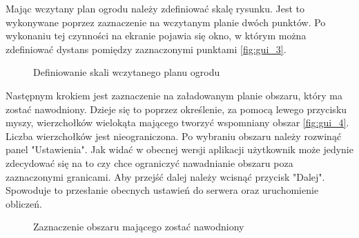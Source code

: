 \documentclass[twoside]{iisthesis}
\begin{document}
Mając wczytany plan ogrodu należy zdefiniować skalę rysunku. Jest to wykonywane poprzez zaznaczenie na wczytanym planie dwóch punktów. Po wykonaniu tej czynności na ekranie pojawia się okno, w którym można zdefiniować dystans pomiędzy zaznaczonymi punktami \eqref{fig:gui_3}.
\begin{figure}[!htb]
	\centering
	\caption{Definiowanie skali wczytanego planu ogrodu}
	\label{fig:gui_3}
\end{figure}

Następnym krokiem jest zaznaczenie na załadowanym planie obszaru, który ma zostać nawodniony. Dzieje się to poprzez określenie, za pomocą lewego przycisku myszy, wierzchołków wielokąta mającego tworzyć wspomniany obszar \eqref{fig:gui_4}. Liczba wierzchołków jest nieograniczona. Po wybraniu obszaru należy rozwinąć panel "Ustawienia". Jak widać w obecnej wersji aplikacji użytkownik może jedynie zdecydować się na to czy chce ograniczyć nawadnianie obszaru poza zaznaczonymi granicami. Aby przejść dalej należy wcisnąć przycisk "Dalej". Spowoduje to przesłanie obecnych ustawień do serwera oraz uruchomienie obliczeń.
\begin{figure}[!htb]
	\centering
	\caption{Zaznaczenie obszaru mającego zostać nawodniony}
	\label{fig:gui_4}
\end{figure}
\end{document}
